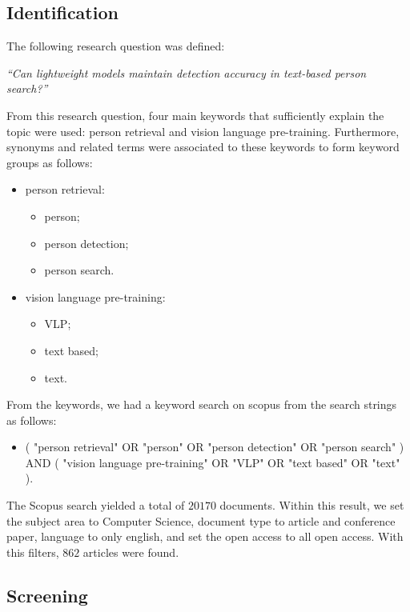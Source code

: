 \subsection*{Identification}

The following research question was defined:

\bigskip
\textit{``Can lightweight models maintain detection accuracy in text-based person search?''}
\bigskip



From this research question, four main keywords that sufficiently explain the topic were used: person retrieval and vision language pre-training.
Furthermore, synonyms and related terms were associated to these keywords to form keyword groups as follows:

\begin{itemize}
    \item person retrieval:
    \begin{itemize}
        \item person;
        \item person detection;
        \item person search.
    \end{itemize}
    \item vision language pre-training:
    \begin{itemize}
        \item VLP;
        \item text based;
        \item text.
    \end{itemize}
\end{itemize}


From the keywords, we had a keyword search on scopus from the search strings as follows:

\begin{itemize}
    \item ( "person retrieval" OR "person" OR "person detection" OR "person search" ) AND ( "vision language pre-training" OR "VLP" OR "text based" OR "text" ).
\end{itemize}

The Scopus search yielded a total of $20170$ documents. Within this result, we set the subject area to Computer Science, document type to article and conference paper, language to only english, and set the open access to all open access. With this filters, $862$ articles were found. 

\subsection*{Screening}

